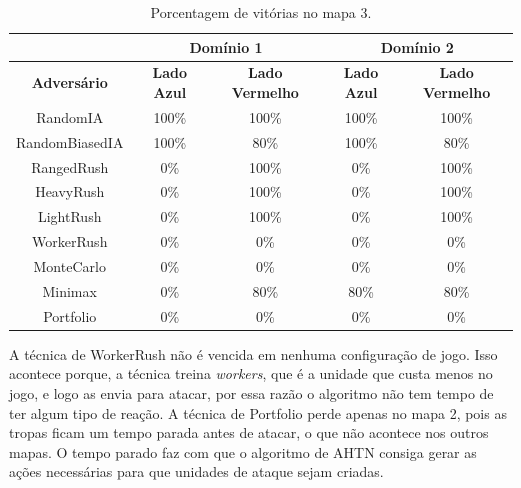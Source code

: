 \begin{table}[ht]
	\centering
	\caption{Porcentagem de vitórias no mapa 3.}
	\label{tab:mapa3}
	\begin{tabular}{|c|cc|cc|}
		\hline
		\textbf{}           & \multicolumn{2}{c|}{\textbf{Domínio 1}}  & \multicolumn{2}{c|}{\textbf{Domínio 2}}  \\ \hline
		\textbf{Adversário} & \textbf{Lado Azul} & \textbf{Lado Vermelho} & \textbf{Lado Azul} & \textbf{Lado Vermelho} \\ \hline
		RandomIA            & 100\%              & 100\%                  & 100\%              & 100\%                  \\ \hline
		RandomBiasedIA      & 100\%              & 80\%                   & 100\%              & 80\%                   \\ \hline
		RangedRush          & 0\%                & 100\%                  & 0\%                & 100\%                  \\ \hline
		HeavyRush           & 0\%                & 100\%                  & 0\%                & 100\%                  \\ \hline
		LightRush           & 0\%                & 100\%                  & 0\%                & 100\%                  \\ \hline
		WorkerRush          & 0\%                & 0\%                    & 0\%                & 0\%                    \\ \hline
		MonteCarlo          & 0\%                & 0\%                    & 0\%                & 0\%                    \\ \hline
		Minimax             & 0\%                & 80\%                  & 80\%              & 80\%                   \\ \hline
		Portfolio           & 0\%                & 0\%                    & 0\%                & 0\%                    \\ \hline
	\end{tabular}
\end{table}

A técnica de WorkerRush não é vencida em nenhuma configuração de jogo.
Isso acontece porque, a técnica treina \textit{workers}, que é a unidade que custa menos no jogo, e logo as envia para atacar, por essa razão o algoritmo não tem tempo de ter algum tipo de reação.
A técnica de Portfolio perde apenas no mapa 2, pois as tropas ficam um tempo parada antes de atacar, o que não acontece nos outros mapas.
O tempo parado faz com que o algoritmo de AHTN consiga gerar as ações necessárias para que unidades de ataque sejam criadas.

